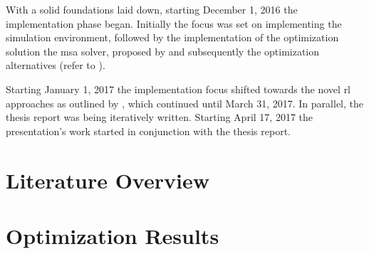 \documentclass[draft=false]{seal_thesis}
\begin{document}
With a solid foundations laid down, starting December 1, 2016 the implementation phase began. Initially the focus was set on implementing the simulation environment, followed by the implementation of the optimization solution \ie the \gls{msa} solver, proposed by \citet{Zeng2005} and subsequently the optimization alternatives (refer to ).


Starting January 1, 2017 the implementation focus shifted towards the novel \gls{rl} approaches as outlined by \citet{Sutton2017}, which continued until March 31, 2017. In parallel, the thesis report was being iteratively written. Starting April 17, 2017 the presentation's work started in conjunction with the thesis report.


\clearpage

\glsresetall

\chapter{Literature Overview}


\clearpage

\glsresetall

\chapter{Optimization Results}

\section{}

\subsection{}
\label{subsec:llqp_kpi_app}

\end{document}
